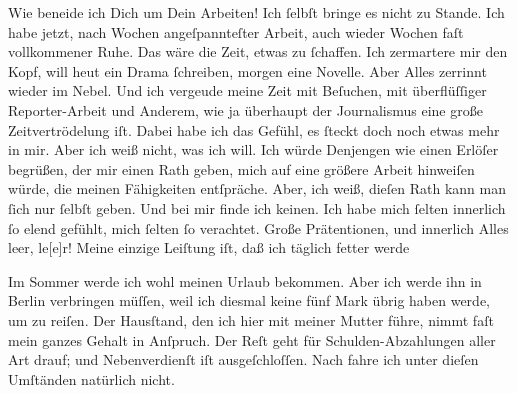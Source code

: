 \pstart
           Wie beneide ich Dich um Dein Arbeiten! Ich ſelbſt bringe es nicht zu Stande. Ich habe
               jetzt, nach Wochen angeſpannteſter Arbeit, auch wieder Wochen faſt vollkommener Ruhe.
               Das wäre die Zeit, etwas zu ſchaffen. Ich zermartere mir den Kopf, will heut ein
               Drama ſchreiben, morgen eine Novelle. Aber Alles {\pb}zerrinnt wieder im Nebel. Und ich vergeude meine Zeit mit Beſuchen, mit
               überflüſſiger Reporter-Arbeit und Anderem, wie ja überhaupt der Journalismus eine
               große Zeitvertrödelung iſt. Dabei habe ich das Gefühl, es ſteckt doch noch etwas mehr
               in mir. Aber ich weiß nicht, was ich will. Ich würde Denjengen\strikeout{,} wie einen Erlöſer begrüßen, der mir einen Rath geben,
               mich auf eine größere Arbeit hinweiſen würde, die  meinen Fähigkeiten entſpräche. Aber, ich weiß, dieſen Rath kann man ſich nur
               ſelbſt geben. Und bei mir finde ich keinen. Ich habe mich ſelten innerlich ſo elend
               gefühlt, mich ſelten ſo verachtet. Große Prätentionen, und innerlich {\pb}Alles leer, le{[}e{]}r! Meine einzige
               Leiſtung iſt, daß ich täglich fetter werde{\dotsfour}\pend
           
\pstart
           Im Sommer werde ich wohl meinen Urlaub bekommen. Aber ich werde ihn in Berlin verbringen müſſen, weil ich diesmal keine
               fünf Mark übrig haben werde, um zu reiſen. Der Hausſtand, den ich hier mit meiner Mutter führe,  nimmt faſt mein ganzes Gehalt in Anſpruch. Der Reſt
               geht für Schulden-Abzahlungen aller Art drauf; und Nebenverdienſt iſt ausgeſchloſſen.
               Nach \label{K_L02911-5v}\label{K_L02911-5} fahre ich unter dieſen Umſtänden natürlich nicht.\pend
           
